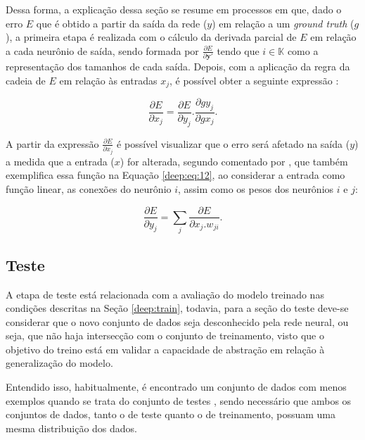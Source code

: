Dessa forma, a explicação dessa seção se resume em processos em que, dado o erro $E$ que é obtido a partir da saída da rede ($y$) em relação a um \textit{ground truth} ($g$), a primeira etapa é realizada com o cálculo da derivada parcial de $E$ em relação a cada neurônio de saída, sendo formada por $\frac{\partial E}{\partial \boldsymbol{y'}}$ tendo que $i \in \mathbb{K}$ como a representação dos tamanhos de cada saída. Depois, com a aplicação da regra da cadeia de $E$ em relação às entradas $x_j$, é possível obter a seguinte expressão \cite{rumelhart1986learning}:

\begin{equation}
    \label{deep:eq:11}
    \frac{\partial E}{\partial x_j} = \frac{\partial E}{\partial y_j} . \frac{\partial g y_j}{\partial g x_j}.
\end{equation}

A partir da expressão $\frac{\partial E}{\partial x_j}$ é possível visualizar que o erro será afetado na saída ($y$) a medida que a entrada ($x$) for alterada, segundo comentado por \cite{rumelhart1986learning}, que também exemplifica essa função na Equação \ref{deep:eq:12}, ao considerar a entrada como função linear, as conexões do neurônio $i$, assim como os pesos dos neurônios $i$ e $j$:

\begin{equation}
    \label{deep:eq:12}
    \frac{\partial E}{\partial y_j} = \sum_j \frac{\partial E}{\partial x_j . w_{ji}}.
\end{equation}


\subsection{Teste}
\label{deep:test}

A etapa de teste está relacionada com a avaliação do modelo treinado nas condições descritas na Seção \ref{deep:train}, todavia, para a seção do teste deve-se considerar que o novo conjunto de dados seja desconhecido pela rede neural, ou seja, que não haja intersecção com o conjunto de treinamento, visto que o objetivo do treino está em validar a capacidade de abstração em relação à generalização do modelo.

Entendido isso, habitualmente, é encontrado um conjunto de dados com menos exemplos quando se trata do conjunto de testes \cite{Goodfellow2016}, sendo necessário que ambos os conjuntos de dados, tanto o de teste quanto o de treinamento, possuam uma mesma distribuição dos dados.

